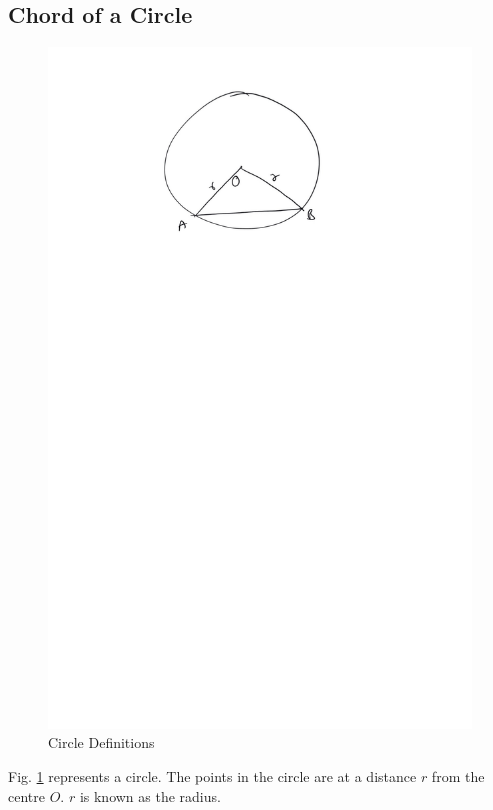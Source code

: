 \subsection{Chord of a Circle}

\begin{figure}[!h]
	\begin{center}
		
		\includegraphics[width=\columnwidth]{./figs/ch4_circle_def}
		\vspace*{-10cm}
	\end{center}
	\caption{Circle Definitions}
	\label{ch4_circle_def}	
\end{figure}
\begin{definition}
	Fig. \ref{ch4_circle_def} represents a circle.  The points in the circle are at a distance $r$ from the centre $O$.  $r$ is known as the radius.
\end{definition}

